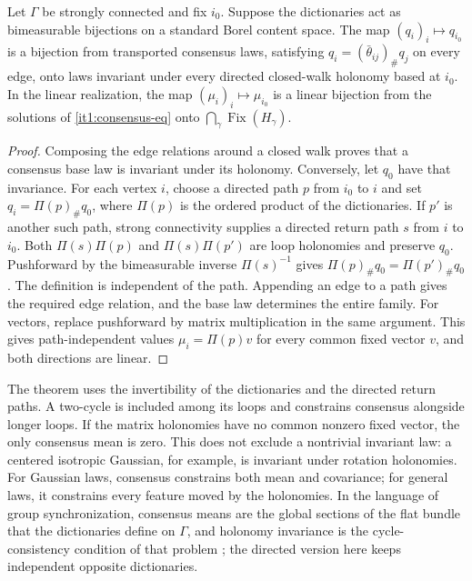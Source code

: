 Let $\Gamma$ be strongly connected and fix $i_0$. Suppose the dictionaries act as bimeasurable bijections on a standard Borel content space. The map $(q_i)_i\mapsto q_{i_0}$ is a bijection from transported consensus laws, satisfying $q_i=(\bar\theta_{ij})_\#q_j$ on every edge, onto laws invariant under every directed closed-walk holonomy based at $i_0$. In the linear realization, the map $(\mu_i)_i\mapsto\mu_{i_0}$ is a linear bijection from the solutions of \cref{it1:consensus-eq} onto $\bigcap_\gamma \operatorname{Fix}(H_\gamma)$.
\begin{proof}
Composing the edge relations around a closed walk proves that a consensus base law is invariant under its holonomy. Conversely, let $q_0$ have that invariance. For each vertex $i$, choose a directed path $p$ from $i_0$ to $i$ and set $q_i=\Pi(p)_\#q_0$, where $\Pi(p)$ is the ordered product of the dictionaries. If $p'$ is another such path, strong connectivity supplies a directed return path $s$ from $i$ to $i_0$. Both $\Pi(s)\Pi(p)$ and $\Pi(s)\Pi(p')$ are loop holonomies and preserve $q_0$. Pushforward by the bimeasurable inverse $\Pi(s)^{-1}$ gives $\Pi(p)_\#q_0=\Pi(p')_\#q_0$. The definition is independent of the path. Appending an edge to a path gives the required edge relation, and the base law determines the entire family. For vectors, replace pushforward by matrix multiplication in the same argument. This gives path-independent values $\mu_i=\Pi(p)v$ for every common fixed vector $v$, and both directions are linear.
\end{proof}

The theorem uses the invertibility of the dictionaries and the directed return paths. A two-cycle is included among its loops and constrains consensus alongside longer loops. If the matrix holonomies have no common nonzero fixed vector, the only consensus mean is zero. This does not exclude a nontrivial invariant law: a centered isotropic Gaussian, for example, is invariant under rotation holonomies. For Gaussian laws, consensus constrains both mean and covariance; for general laws, it constrains every feature moved by the holonomies. In the language of group synchronization, consensus means are the global sections of the flat bundle that the dictionaries define on $\Gamma$, and holonomy invariance is the cycle-consistency condition of that problem \citep{Singer2011,GaoBrodzkiMukherjee2021}; the directed version here keeps independent opposite dictionaries.

